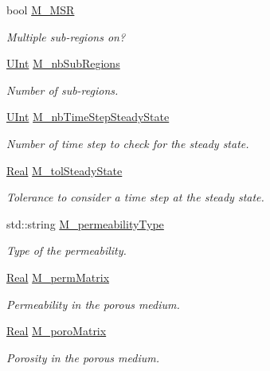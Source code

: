 \begin{DoxyCompactItemize}
bool \hyperlink{classFVCode3D_1_1Data_a79a937025567c594d491124fdd7371d1}{M\+\_\+\+M\+SR}
\begin{DoxyCompactList}\small\item\em Multiple sub-\/regions on? \end{DoxyCompactList}\item 
\hyperlink{namespaceFVCode3D_a4bf7e328c75d0fd504050d040ebe9eda}{U\+Int} \hyperlink{classFVCode3D_1_1Data_a939f25d917c0fc4cc307727f0161818d}{M\+\_\+nb\+Sub\+Regions}
\begin{DoxyCompactList}\small\item\em Number of sub-\/regions. \end{DoxyCompactList}\item 
\hyperlink{namespaceFVCode3D_a4bf7e328c75d0fd504050d040ebe9eda}{U\+Int} \hyperlink{classFVCode3D_1_1Data_a89795eb2a12c28f1f919c3148c44556e}{M\+\_\+nb\+Time\+Step\+Steady\+State}
\begin{DoxyCompactList}\small\item\em Number of time step to check for the steady state. \end{DoxyCompactList}\item 
\hyperlink{namespaceFVCode3D_a40c1f5588a248569d80aa5f867080e83}{Real} \hyperlink{classFVCode3D_1_1Data_a985779d5af3b0a0cdee095d599f4edc5}{M\+\_\+tol\+Steady\+State}
\begin{DoxyCompactList}\small\item\em Tolerance to consider a time step at the steady state. \end{DoxyCompactList}\item 
std\+::string \hyperlink{classFVCode3D_1_1Data_a313a43a63768026ac108106fa90113c9}{M\+\_\+permeability\+Type}
\begin{DoxyCompactList}\small\item\em Type of the permeability. \end{DoxyCompactList}\item 
\hyperlink{namespaceFVCode3D_a40c1f5588a248569d80aa5f867080e83}{Real} \hyperlink{classFVCode3D_1_1Data_aa91f66274ed34a57c63f5c106b371109}{M\+\_\+perm\+Matrix}
\begin{DoxyCompactList}\small\item\em Permeability in the porous medium. \end{DoxyCompactList}\item 
\hyperlink{namespaceFVCode3D_a40c1f5588a248569d80aa5f867080e83}{Real} \hyperlink{classFVCode3D_1_1Data_ab4e2bcf1ebf986f6e5329b695707a73e}{M\+\_\+poro\+Matrix}
\begin{DoxyCompactList}\small\item\em Porosity in the porous medium. \end{DoxyCompactList}\item 

\end{DoxyCompactItemize}
